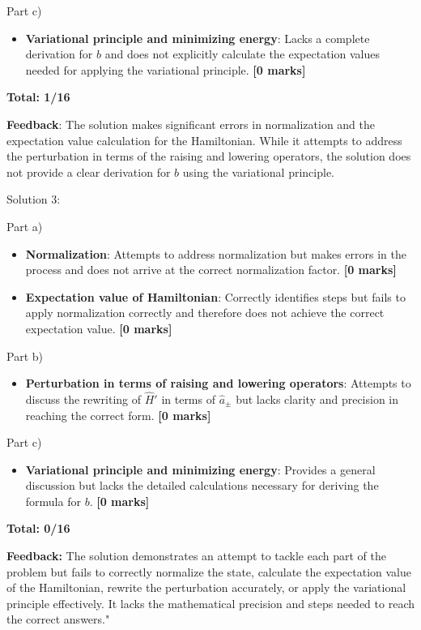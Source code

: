 \documentclass[a4paper,11pt]{article}
\begin{document}
Part c)

\begin{itemize}
    \item \textbf{Variational principle and minimizing energy}: Lacks a complete derivation for \(b\) and does not explicitly calculate the expectation values needed for applying the variational principle. \textbf{[0 marks]}
\end{itemize}

\textbf{Total: 1/16}

\textbf{Feedback}: The solution makes significant errors in normalization and the expectation value calculation for the Hamiltonian. While it attempts to address the perturbation in terms of the raising and lowering operators, the solution does not provide a clear derivation for \(b\) using the variational principle.

Solution 3:

Part a)

\begin{itemize}
    \item \textbf{Normalization}: Attempts to address normalization but makes errors in the process and does not arrive at the correct normalization factor. \textbf{[0 marks]}
    \item \textbf{Expectation value of Hamiltonian}: Correctly identifies steps but fails to apply normalization correctly and therefore does not achieve the correct expectation value. \textbf{[0 marks]}
\end{itemize}

Part b)

\begin{itemize}
    \item \textbf{Perturbation in terms of raising and lowering operators}: Attempts to discuss the rewriting of \( \hat{H}' \) in terms of \( \hat{a}_{\pm} \) but lacks clarity and precision in reaching the correct form. \textbf{[0 marks]}
\end{itemize}

Part c)

\begin{itemize}
    \item \textbf{Variational principle and minimizing energy}: Provides a general discussion but lacks the detailed calculations necessary for deriving the formula for \(b\). \textbf{[0 marks]}
\end{itemize}

\textbf{Total: 0/16}

\textbf{Feedback:} The solution demonstrates an attempt to tackle each part of the problem but fails to correctly normalize the state, calculate the expectation value of the Hamiltonian, rewrite the perturbation accurately, or apply the variational principle effectively. It lacks the mathematical precision and steps needed to reach the correct answers."
\end{document}
